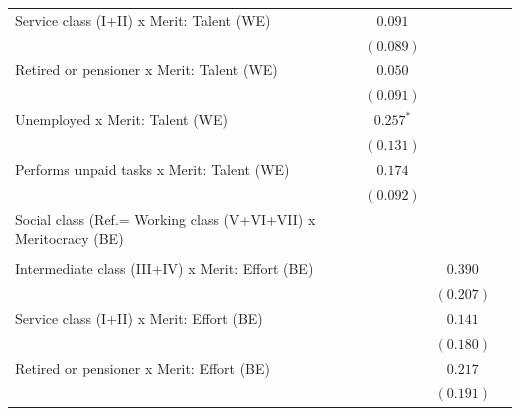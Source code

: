 \documentclass[
  12pt,
]{article}
\begin{document}
\begin{table}
\begin{center}
{\begin{tabular}{l c c c c}
\quad Service class (I+II) x Merit: Talent (WE)                 &             & $0.091$     &             &             \\
                                                                &             & $(0.089)$   &             &             \\
\quad Retired or pensioner x Merit: Talent (WE)                 &             & $0.050$     &             &             \\
                                                                &             & $(0.091)$   &             &             \\
\quad Unemployed x Merit: Talent (WE)                           &             & $0.257^{*}$ &             &             \\
                                                                &             & $(0.131)$   &             &             \\
\quad Performs unpaid tasks x Merit: Talent (WE)                &             & $0.174$     &             &             \\
                                                                &             & $(0.092)$   &             &             \\
Social class (Ref.= Working class (V+VI+VII) x Meritocracy (BE) &             &             &             &             \\
                                                                &             &             &             &             \\
\quad Intermediate class (III+IV) x Merit: Effort (BE)          &             &             & $0.390$     &             \\
                                                                &             &             & $(0.207)$   &             \\
\quad Service class (I+II) x Merit: Effort (BE)                 &             &             & $0.141$     &             \\
                                                                &             &             & $(0.180)$   &             \\
\quad Retired or pensioner x Merit: Effort (BE)                 &             &             & $0.217$     &             \\
                                                                &             &             & $(0.191)$   &             \\

\end{tabular}}
\end{center}
\end{table}
\end{document}
